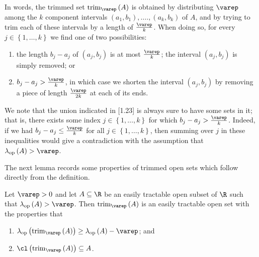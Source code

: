\documentclass[pmath450]{subfiles}
\begin{document}
    \np In words, the trimmed set $\trim_{\varep}\left( A \right)$ is obtained by distributing $\varep$ among the $k$ component intervals $\left( a_1,b_1 \right),\ldots.,\left( a_k,b_k \right)$ of $A$, and by trying to trim each of these intervals by a length of $\frac{\varep}{k}$. When doing so, for every $j\in\left\lbrace 1,\ldots,k \right\rbrace$ we find one of two possibilities:
    \begin{enumerate}
        \item the length $b_j-a_j$ of $\left( a_j,b_j \right)$ is at most $\frac{\varep}{k}$; the interval $\left( a_j,b_j \right)$ is simply removed; or
        \item $b_j-a_j>\frac{\varep}{k}$, in which case we shorten the interval $\left( a_j,b_j \right)$ by removing a piece of length $\frac{\varep}{2k}$ at each of its ends.
    \end{enumerate}
    We note that the union indicated in [1.23] is always sure to have some sets in it; that is, there exists some index $j\in\left\lbrace 1,\ldots,k \right\rbrace$ for which $b_j-a_j>\frac{\varep}{k}$. Indeed, if we had $b_j-a_j\leq \frac{\varep}{k}$ for all $j\in\left\lbrace 1,\ldots,k \right\rbrace$, then summing over $j$ in these inequalities would give a contradiction with the assumption that $\lambda_{\op}\left( A \right)>\varep$.

    \np The next lemma records some properties of trimmed open sets which follow directly from the definition.

    \begin{lemma}{}
        Let $\varep>0$ and let $A\subseteq\R$ be an easily tractable open subset of $\R$ such that $\lambda_{\op}\left( A \right)>\varep$. Then $\trim_{\varep}\left( A \right)$ is an easily tractable open set with the properties that
        \begin{enumerate}
            \item $\lambda_{\op}\left( \trim_{\varep}\left( A \right) \right)\geq\lambda_{\op}\left( A \right)-\varep$; and
            \item $\cl\left( \trim_{\varep}\left( A \right) \right)\subseteq A$.
        \end{enumerate}
    \end{lemma}
\end{document}
